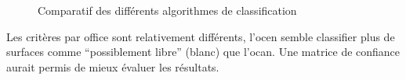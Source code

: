 \begin{figure}[H]
    \centering
    \caption{Comparatif des différents algorithmes de classification \cite{herny_detection_2024}}
    \label{fig:stdl_04_rf_resultats}
\end{figure}

Les critères par office sont relativement différents, l'\acrshort{ocen} semble classifier plus de surfaces comme ``possiblement libre'' (blanc) que l'\acrshort{ocan}. Une matrice de confiance aurait permis de mieux évaluer les résultats.

